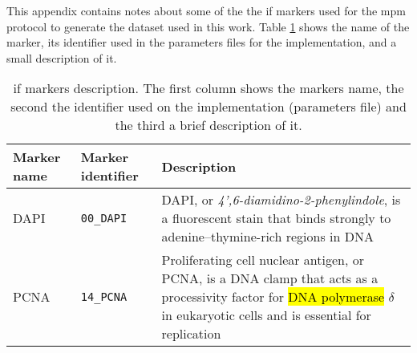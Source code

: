 
\glsresetall

This appendix contains notes about some of the the \gls{if} markers used for the \gls{mpm} protocol to generate the dataset used in this work. Table \ref{table:apendix:if_markers} shows the name of the marker, its identifier used in the parameters files for the implementation, and a small description of it.

\setlength{\mylinewidth}{\linewidth-7pt}%
\setlength{\mylengtha}{0.12\mylinewidth-2\arraycolsep}%
\setlength{\mylengthb}{0.15\mylinewidth-2\arraycolsep}%
\setlength{\mylengthc}{0.73\mylinewidth-2\arraycolsep}%

\begin{table}[!ht]
  \centering
  \begin{tabular}{>{\centering\arraybackslash}m{\mylengtha}|>{\centering\arraybackslash}m{\mylengthb}|m{\mylengthc}} %
    \hline
    Marker name & Marker identifier & Description \\
    \hline
    DAPI & \texttt{00\_DAPI} & DAPI, or \textit{4',6-diamidino-2-phenylindole}, is a fluorescent stain that binds strongly to adenine–thymine-rich regions in DNA \cite{kapuscinski1995dapi} \\
    \hline
    PCNA & \texttt{14\_PCNA} & Proliferating cell nuclear antigen, or PCNA, is a DNA clamp that acts as a processivity factor for \hl{DNA polymerase} $\delta$\footnotemark in eukaryotic cells and is essential for replication \cite{kisielewska2005gfp} \\
    \hline
  \end{tabular}
  \caption{\Acrlong{if} markers description. The first column shows the markers name, the second the identifier used on the implementation (parameters file) and the third a brief description of it.}
  \label{table:apendix:if_markers}
\end{table}
